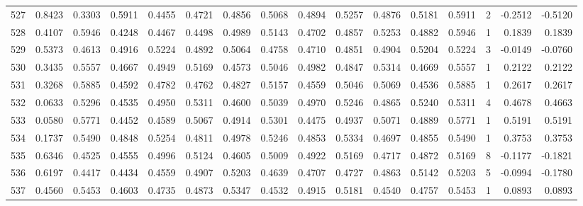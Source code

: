 \begin{tabular}{lrrrrrrrrrrrrrrr}
527 &      0.8423 &  0.3303 &  0.5911 &  0.4455 &  0.4721 &  0.4856 &  0.5068 &  0.4894 &  0.5257 &  0.4876 &   0.5181 &     0.5911 &      2 &                   -0.2512 &                    -0.5120 \\
528 &      0.4107 &  0.5946 &  0.4248 &  0.4467 &  0.4498 &  0.4989 &  0.5143 &  0.4702 &  0.4857 &  0.5253 &   0.4882 &     0.5946 &      1 &                    0.1839 &                     0.1839 \\
529 &      0.5373 &  0.4613 &  0.4916 &  0.5224 &  0.4892 &  0.5064 &  0.4758 &  0.4710 &  0.4851 &  0.4904 &   0.5204 &     0.5224 &      3 &                   -0.0149 &                    -0.0760 \\
530 &      0.3435 &  0.5557 &  0.4667 &  0.4949 &  0.5169 &  0.4573 &  0.5046 &  0.4982 &  0.4847 &  0.5314 &   0.4669 &     0.5557 &      1 &                    0.2122 &                     0.2122 \\
531 &      0.3268 &  0.5885 &  0.4592 &  0.4782 &  0.4762 &  0.4827 &  0.5157 &  0.4559 &  0.5046 &  0.5069 &   0.4536 &     0.5885 &      1 &                    0.2617 &                     0.2617 \\
532 &      0.0633 &  0.5296 &  0.4535 &  0.4950 &  0.5311 &  0.4600 &  0.5039 &  0.4970 &  0.5246 &  0.4865 &   0.5240 &     0.5311 &      4 &                    0.4678 &                     0.4663 \\
533 &      0.0580 &  0.5771 &  0.4452 &  0.4589 &  0.5067 &  0.4914 &  0.5301 &  0.4475 &  0.4937 &  0.5071 &   0.4889 &     0.5771 &      1 &                    0.5191 &                     0.5191 \\
534 &      0.1737 &  0.5490 &  0.4848 &  0.5254 &  0.4811 &  0.4978 &  0.5246 &  0.4853 &  0.5334 &  0.4697 &   0.4855 &     0.5490 &      1 &                    0.3753 &                     0.3753 \\
535 &      0.6346 &  0.4525 &  0.4555 &  0.4996 &  0.5124 &  0.4605 &  0.5009 &  0.4922 &  0.5169 &  0.4717 &   0.4872 &     0.5169 &      8 &                   -0.1177 &                    -0.1821 \\
536 &      0.6197 &  0.4417 &  0.4434 &  0.4559 &  0.4907 &  0.5203 &  0.4639 &  0.4707 &  0.4727 &  0.4863 &   0.5142 &     0.5203 &      5 &                   -0.0994 &                    -0.1780 \\
537 &      0.4560 &  0.5453 &  0.4603 &  0.4735 &  0.4873 &  0.5347 &  0.4532 &  0.4915 &  0.5181 &  0.4540 &   0.4757 &     0.5453 &      1 &                    0.0893 &                     0.0893 \\

\end{tabular}
